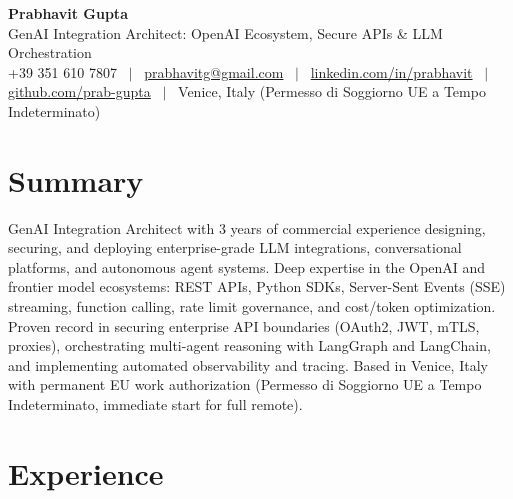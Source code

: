 \documentclass[a4paper,10pt]{article}
\begin{document}
\begin{minipage}[c]{0.80\textwidth}
  {\Huge\bfseries Prabhavit Gupta}\\[3pt]
  {\color{accent}\large GenAI Integration Architect: OpenAI Ecosystem, Secure APIs \& LLM Orchestration}\\[6pt]
  {\footnotesize +39 351 610 7807 ~$\vert$~
  \href{mailto:prabhavitg@gmail.com}{prabhavitg@gmail.com} ~$\vert$~
  \href{https://www.linkedin.com/in/prabhavit/}{linkedin.com/in/prabhavit} ~$\vert$~
  \href{https://github.com/prab-gupta}{github.com/prab-gupta} ~$\vert$~
  Venice, Italy (Permesso di Soggiorno UE a Tempo Indeterminato)}
\end{minipage}\hfill

\section{Summary}
GenAI Integration Architect with 3 years of commercial experience designing, securing, and deploying enterprise-grade LLM integrations, conversational platforms, and autonomous agent systems. Deep expertise in the OpenAI and frontier model ecosystems: REST APIs, Python SDKs, Server-Sent Events (SSE) streaming, function calling, rate limit governance, and cost/token optimization. Proven record in securing enterprise API boundaries (OAuth2, JWT, mTLS, proxies), orchestrating multi-agent reasoning with LangGraph and LangChain, and implementing automated observability and tracing. Based in Venice, Italy with permanent EU work authorization (Permesso di Soggiorno UE a Tempo Indeterminato, immediate start for full remote).

\section{Experience}
\end{document}
